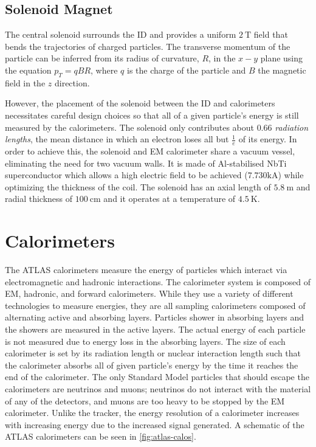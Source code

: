 \subsection{Solenoid Magnet}

The central solenoid surrounds the \ac{ID} and provides a uniform $2~\textrm{T}$ field that bends the trajectories of charged particles. The transverse momentum of the particle can be inferred from its radius of curvature, $R$, in the $x-y$ plane using the equation $p_{T} = qBR$, where $q$ is the charge of the particle and $B$ the magnetic field in the $z$ direction.

However, the placement of the solenoid between the \ac{ID} and calorimeters necessitates careful design choices so that all of a given particle's energy is still measured by the calorimeters. The solenoid only contributes about $0.66$ \emph{radiation lengths}, the mean distance in which an electron loses all but $\frac{1}{e}$ of its energy. In order to achieve this, the solenoid and \ac{EM} calorimeter share a vacuum vessel, eliminating the need for two vacuum walls. It is made of Al-stabilised NbTi superconductor which allows a high electric field to be achieved ($7.730 \textrm{kA}$) while optimizing the thickness of the coil. The solenoid has an axial length of $5.8~\textrm{m}$ and radial thickness of $100~ \textrm{cm}$ and it operates at a temperature of $4.5~\textrm{K}$. 


\section{Calorimeters}

The \ac{ATLAS} calorimeters measure the energy of particles which interact via electromagnetic and hadronic interactions. The calorimeter system is composed of \ac{EM}, hadronic, and forward calorimeters. While they use a variety of different technologies to measure energies, they are all sampling calorimeters composed of alternating active and absorbing layers. Particles shower in absorbing layers and the showers are measured in the active layers. The actual energy of each particle is not measured due to energy loss in the absorbing layers. The size of each calorimeter is set by its radiation length or nuclear interaction length such that the calorimeter absorbs all of given particle's energy by the time it reaches the end of the calorimeter. The only Standard Model particles that should escape the calorimeters are neutrinos and muons; neutrinos do not interact with the material of any of the detectors, and muons are too heavy to be stopped by the EM calorimeter. Unlike the tracker, the energy resolution of a calorimeter increases with increasing energy due to the increased signal generated.  A schematic of the \ac{ATLAS} calorimeters can be seen in \autoref{fig:atlas-calos}.


